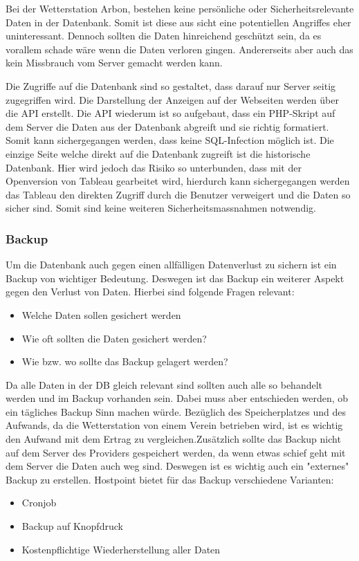 Bei der Wetterstation Arbon, bestehen keine persönliche oder Sicherheitsrelevante Daten in der Datenbank. Somit ist diese aus sicht eine potentiellen Angriffes eher uninteressant. Dennoch sollten die Daten hinreichend geschützt sein, da es vorallem schade wäre wenn die Daten verloren gingen. Andererseits aber auch das kein Missbrauch vom Server gemacht werden kann. 

Die Zugriffe auf die Datenbank sind so gestaltet, dass darauf nur Server seitig zugegriffen wird. Die Darstellung der Anzeigen auf der Webseiten werden über die API erstellt. Die API wiederum ist so aufgebaut, dass ein PHP-Skript auf dem Server die Daten aus der Datenbank abgreift und sie richtig formatiert. Somit kann sichergegangen werden, dass keine SQL-Infection möglich ist. Die einzige Seite welche direkt auf die Datenbank zugreift ist die historische Datenbank. Hier wird jedoch das Risiko so unterbunden, dass mit der Openversion von Tableau gearbeitet wird, hierdurch kann sichergegangen werden das Tableau den direkten Zugriff durch die Benutzer verweigert und die Daten so sicher sind. Somit sind keine weiteren Sicherheitsmassnahmen notwendig.

\subsubsection{Backup}

Um die Datenbank auch gegen einen allfälligen Datenverlust zu sichern ist ein Backup von wichtiger Bedeutung. Deswegen ist das Backup ein weiterer Aspekt gegen den Verlust von Daten. Hierbei sind folgende Fragen relevant:
\begin{itemize}
\item Welche Daten sollen gesichert werden
\item Wie oft sollten die Daten gesichert werden?
\item Wie bzw. wo sollte das Backup gelagert werden? 
\end{itemize}

Da alle Daten in der DB gleich relevant sind sollten auch alle so behandelt werden und im Backup vorhanden sein. Dabei muss aber entschieden werden, ob ein tägliches Backup Sinn machen würde. Bezüglich des Speicherplatzes und des Aufwands, da die Wetterstation von einem Verein betrieben wird, ist es wichtig den Aufwand mit dem Ertrag zu vergleichen.Zusätzlich sollte das Backup nicht auf dem Server des Providers gespeichert werden, da wenn etwas schief geht mit dem Server die Daten auch weg sind. Deswegen ist es wichtig auch ein "externes" Backup zu erstellen. Hostpoint bietet für das Backup verschiedene Varianten:
\begin{itemize}
\item Cronjob
\item Backup auf Knopfdruck
\item Kostenpflichtige Wiederherstellung aller Daten
\end{itemize}


